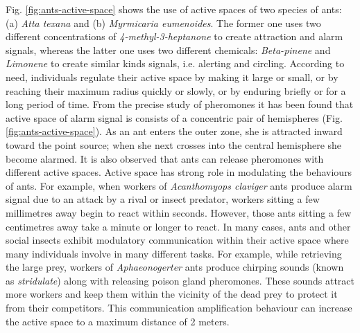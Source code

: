 \documentclass{intech}
\begin{document}
Fig. \ref{fig:ants-active-space} shows the use of active spaces of two species of ants: (a) {\em Atta texana} and (b) {\em Myrmicaria eumenoides}.  The former one uses two different concentrations of {\em 4-methyl-3-heptanone} to create attraction and alarm signals, whereas the latter one uses two different chemicals: {\em Beta-pinene} and {\em Limonene} to create similar kinds signals, i.e. alerting and circling.
 According to need, individuals regulate their active space by making it large or small, or by reaching their maximum radius quickly or slowly, or by enduring briefly or for a long period of time. From the precise study of pheromones it has been found that active space of alarm signal is consists of a concentric pair of hemispheres (Fig. \ref{fig:ants-active-space}). As an ant enters the outer zone, she is attracted inward toward the point source; when she next crosses into the central hemisphere she become alarmed. It is also observed that ants can release pheromones with different active spaces.
Active space has strong role in modulating the behaviours of ants. For example, when workers of {\em Acanthomyops claviger} ants produce alarm signal due to an attack by a rival or insect predator, workers sitting a few millimetres away begin to react within seconds. However, those ants sitting a few centimetres away take a minute or longer to react. In many cases, ants and other social insects exhibit modulatory communication within their active space where many individuals involve in many different tasks. For example, while retrieving the large prey, workers of {\em Aphaeonogerter} ants produce chirping sounds (known as \textit{stridulate}) along with releasing poison gland pheromones. These sounds attract more workers and keep them within the vicinity of the dead prey to protect it from their competitors. This communication amplification behaviour can increase the active space to a maximum distance of 2 meters.

\end{document}
